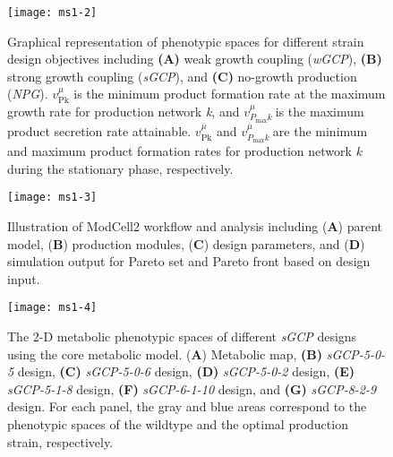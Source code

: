 \begin{figure}[h]
  \centering
  \texttt{[image: ms1-2]}
    \caption[Graphical representation of phenotypic spaces for different strain design objectives]{
Graphical representation of phenotypic spaces for
different strain design objectives including \textbf{(A)} weak growth
coupling (\emph{wGCP}), \textbf{(B)} strong growth coupling
(\emph{sGCP}), and \textbf{(C)} no-growth production (\emph{NPG}).
\(v_{\text{Pk}}^{\mu}\) is the minimum product formation rate at the
maximum growth rate for production network \emph{k}, and
\(v_{P_{\max}k}^{\mu}\ \)is the maximum product secretion rate
attainable. \(v_{\text{Pk}}^{\overline{\mu}}\) and
\(v_{P_{\max}k}^{\overline{\mu}}\ \)are the minimum and maximum product
formation rates for production network \(k\) during the stationary
phase, respectively.
    }
    \label{fig:ms1-fig2}
\end{figure}

\begin{figure}[h]
  \centering
  \texttt{[image: ms1-3]}
    \caption[ModCell2 workflow and analysis]{
Illustration of ModCell2 workflow and analysis
including (\textbf{A}) parent model, (\textbf{B}) production modules,
(\textbf{C}) design parameters, and (\textbf{D}) simulation output for
Pareto set and Pareto front based on design input.
    }
    \label{fig:ms1-fig3}
\end{figure}

\begin{figure}[h]
  \centering
  \texttt{[image: ms1-4]}
    \caption[2-D metabolic phenotypic spaces of different \emph{sGCP} designs using the core metabolic model]{
The 2-D metabolic phenotypic spaces of different
\emph{sGCP} designs using the core metabolic model. (\textbf{A})
Metabolic map, \textbf{(B)} \emph{sGCP-5-0-5} design, \textbf{(C)}
\emph{sGCP-5-0-6} design, \textbf{(D)} \emph{sGCP-5-0-2} design,
\textbf{(E)} \emph{sGCP-5-1-8} design, \textbf{(F)} \emph{sGCP-6-1-10}
design, and \textbf{(G)} \emph{sGCP-8-2-9} design. For each panel, the
gray and blue areas correspond to the phenotypic spaces of the wildtype
and the optimal production strain, respectively.
    }
    \label{fig:ms1-fig4}
\end{figure}

